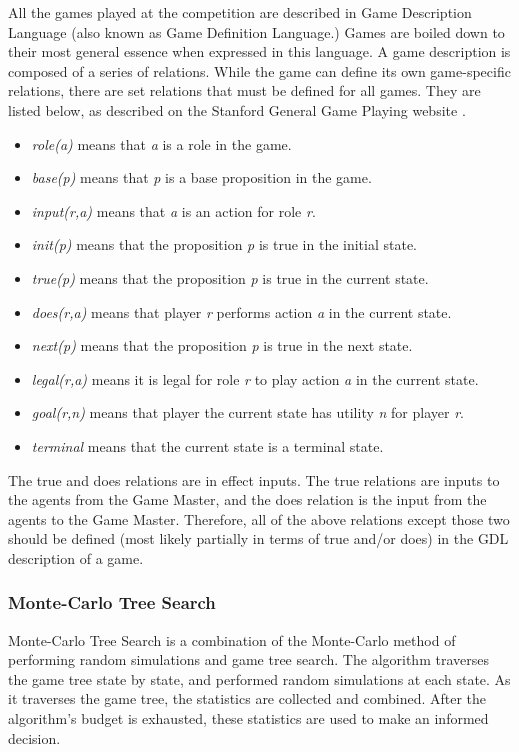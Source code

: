 \documentclass[letterpaper]{article}
\begin{document}
All the games played at the competition are described in Game Description Language (also known as Game Definition Language.) Games are boiled down to their most general essence when expressed in this language. A game description is composed of a series of relations. While the game can define its own game-specific relations, there are set relations that must be defined for all games. They are listed below, as described on the Stanford General Game Playing website \cite{StanfordGGP}.
\begin{itemize}
\item \emph{role(a)} means that \emph{a} is a role in the game.
\item \emph{base(p)} means that \emph{p} is a base proposition in the game.
\item \emph{input(r,a)} means that \emph{a} is an action for role \emph{r}.
\item \emph{init(p)} means that the proposition \emph{p} is true in the initial state.
\item \emph{true(p)} means that the proposition \emph{p} is true in the current state.
\item \emph{does(r,a)} means that player \emph{r} performs action \emph{a} in the current state.
\item \emph{next(p)} means that the proposition \emph{p} is true in the next state.
\item \emph{legal(r,a)} means it is legal for role \emph{r} to play action \emph{a} in the current state.
\item \emph{goal(r,n)} means that player the current state has utility \emph{n} for player \emph{r}.
\item \emph{terminal} means that the current state is a terminal state.
\end{itemize}

The true and does relations are in effect inputs. The true relations are inputs to the agents from the Game Master, and the does relation is the input from the agents to the Game Master. Therefore, all of the above relations except those two should be defined (most likely partially in terms of true and/or does) in the GDL description of a game.

\subsubsection{Monte-Carlo Tree Search}
Monte-Carlo Tree Search is a combination of the Monte-Carlo method of performing random simulations and game tree search. The algorithm traverses the game tree state by state, and performed random simulations at each state. As it traverses the game tree, the statistics are collected and combined. After the algorithm's budget is exhausted, these statistics are used to make an informed decision.
\end{document}
